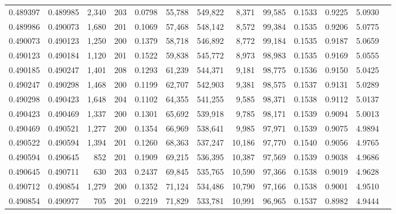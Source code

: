 \begin{tabular}{rrrrrrrrrrrrr}
0.489397 & 0.489985 & 2,340 & 203 &                                     0.0798 &  55,788 & 549,822 &   8,371 &  99,585 & 0.1533 & 0.9225 & 5.0930 \\
0.489986 & 0.490073 & 1,680 & 201 &                                     0.1069 &  57,468 & 548,142 &   8,572 &  99,384 & 0.1535 & 0.9206 & 5.0775 \\
0.490073 & 0.490123 & 1,250 & 200 &                                     0.1379 &  58,718 & 546,892 &   8,772 &  99,184 & 0.1535 & 0.9187 & 5.0659 \\
0.490123 & 0.490184 & 1,120 & 201 &                                     0.1522 &  59,838 & 545,772 &   8,973 &  98,983 & 0.1535 & 0.9169 & 5.0555 \\
0.490185 & 0.490247 & 1,401 & 208 &                                     0.1293 &  61,239 & 544,371 &   9,181 &  98,775 & 0.1536 & 0.9150 & 5.0425 \\
0.490247 & 0.490298 & 1,468 & 200 &                                     0.1199 &  62,707 & 542,903 &   9,381 &  98,575 & 0.1537 & 0.9131 & 5.0289 \\
0.490298 & 0.490423 & 1,648 & 204 &                                     0.1102 &  64,355 & 541,255 &   9,585 &  98,371 & 0.1538 & 0.9112 & 5.0137 \\
0.490423 & 0.490469 & 1,337 & 200 &                                     0.1301 &  65,692 & 539,918 &   9,785 &  98,171 & 0.1539 & 0.9094 & 5.0013 \\
0.490469 & 0.490521 & 1,277 & 200 &                                     0.1354 &  66,969 & 538,641 &   9,985 &  97,971 & 0.1539 & 0.9075 & 4.9894 \\
0.490522 & 0.490594 & 1,394 & 201 &                                     0.1260 &  68,363 & 537,247 &  10,186 &  97,770 & 0.1540 & 0.9056 & 4.9765 \\
0.490594 & 0.490645 &   852 & 201 &                                     0.1909 &  69,215 & 536,395 &  10,387 &  97,569 & 0.1539 & 0.9038 & 4.9686 \\
0.490645 & 0.490711 &   630 & 203 &                                     0.2437 &  69,845 & 535,765 &  10,590 &  97,366 & 0.1538 & 0.9019 & 4.9628 \\
0.490712 & 0.490854 & 1,279 & 200 &                                     0.1352 &  71,124 & 534,486 &  10,790 &  97,166 & 0.1538 & 0.9001 & 4.9510 \\
0.490854 & 0.490977 &   705 & 201 &                                     0.2219 &  71,829 & 533,781 &  10,991 &  96,965 & 0.1537 & 0.8982 & 4.9444 \\

\end{tabular}
